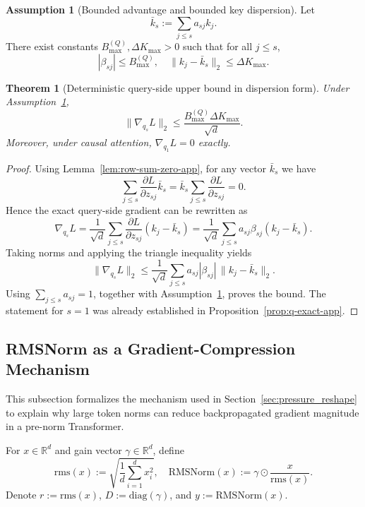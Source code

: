 \documentclass{article}
\theoremstyle{plain}
\newtheorem{theorem}{Theorem}
\theoremstyle{definition}
\newtheorem{assumption}{Assumption}
\theoremstyle{remark}
\begin{document}
\begin{assumption}[Bounded advantage and bounded key dispersion]\label{assump:q-bounded-app}
Let
\[
    \bar{k}_s := \sum_{j \le s} a_{sj} k_j.
\]
There exist constants $B_{\max}^{(Q)}, \Delta K_{\max} > 0$ such that for all $j \le s$,
\[
    |\beta_{sj}| \le B_{\max}^{(Q)},
    \quad
    \|k_j - \bar{k}_s\|_2 \le \Delta K_{\max}.
\]
\end{assumption}

\begin{theorem}[Deterministic query-side upper bound in dispersion form]\label{thm:q-bound-app}
Under Assumption~\ref{assump:q-bounded-app},
\[
    \|\nabla_{q_s}L\|_2 \le \frac{B_{\max}^{(Q)} \Delta K_{\max}}{\sqrt{d}}.
\]
Moreover, under causal attention, $\nabla_{q_1}L = 0$ exactly.
\end{theorem}

\begin{proof}
Using Lemma~\ref{lem:row-sum-zero-app}, for any vector $\bar{k}_s$ we have
\[
    \sum_{j \le s} \frac{\partial L}{\partial z_{sj}}\bar{k}_s = \bar{k}_s \sum_{j \le s} \frac{\partial L}{\partial z_{sj}} = 0.
\]
Hence the exact query-side gradient can be rewritten as
\[
    \nabla_{q_s}L
    = \frac{1}{\sqrt{d}} \sum_{j \le s} \frac{\partial L}{\partial z_{sj}} (k_j - \bar{k}_s)
    = \frac{1}{\sqrt{d}} \sum_{j \le s} a_{sj}\beta_{sj}(k_j - \bar{k}_s).
\]
Taking norms and applying the triangle inequality yields
\[
    \|\nabla_{q_s}L\|_2
    \le \frac{1}{\sqrt{d}} \sum_{j \le s} a_{sj}|\beta_{sj}|\,\|k_j - \bar{k}_s\|_2.
\]
Using $\sum_{j \le s} a_{sj}=1$, together with Assumption~\ref{assump:q-bounded-app}, proves the bound.
The statement for $s=1$ was already established in Proposition~\ref{prop:q-exact-app}.
\end{proof}

\subsection{RMSNorm as a Gradient-Compression Mechanism}\label{app:theory:rmsnorm}
This subsection formalizes the mechanism used in Section~\ref{sec:pressure_reshape} to explain why large token norms can reduce backpropagated gradient magnitude in a pre-norm Transformer.

For $x \in \mathbb{R}^d$ and gain vector $\gamma \in \mathbb{R}^d$, define
\[
    \mathrm{rms}(x) := \sqrt{\frac{1}{d}\sum_{i=1}^d x_i^2},
    \quad
    \mathrm{RMSNorm}(x) := \gamma \odot \frac{x}{\mathrm{rms}(x)}.
\]
Denote $r := \mathrm{rms}(x)$, $D := \mathrm{diag}(\gamma)$, and $y := \mathrm{RMSNorm}(x)$.
\end{document}
